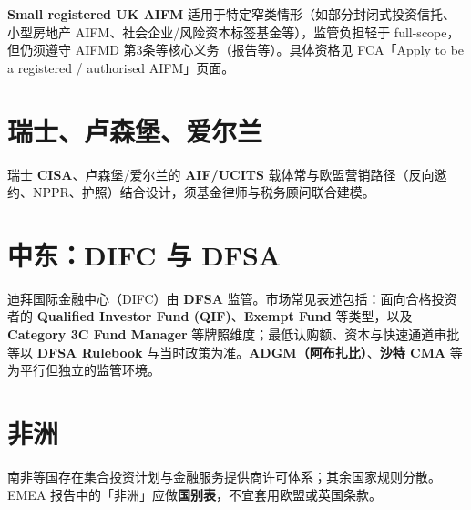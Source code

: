 \textbf{Small registered UK AIFM} 适用于特定窄类情形（如部分封闭式投资信托、小型房地产 AIFM、社会企业/风险资本标签基金等），监管负担轻于 full-scope，但仍须遵守 AIFMD 第3条等核心义务（报告等）。具体资格见 FCA「Apply to be a registered / authorised AIFM」页面。

\section{瑞士、卢森堡、爱尔兰}

瑞士 \textbf{CISA}、卢森堡/爱尔兰的 \textbf{AIF/UCITS} 载体常与欧盟营销路径（反向邀约、NPPR、护照）结合设计，须基金律师与税务顾问联合建模。

\section{中东：DIFC 与 DFSA}

迪拜国际金融中心（DIFC）由 \textbf{DFSA} 监管。市场常见表述包括：面向合格投资者的 \textbf{Qualified Investor Fund (QIF)}、\textbf{Exempt Fund} 等类型，以及 \textbf{Category 3C Fund Manager} 等牌照维度；最低认购额、资本与快速通道审批等以 \textbf{DFSA Rulebook} 与当时政策为准。\textbf{ADGM（阿布扎比）}、\textbf{沙特 CMA} 等为平行但独立的监管环境。

\section{非洲}

南非等国存在集合投资计划与金融服务提供商许可体系；其余国家规则分散。EMEA 报告中的「非洲」应做\textbf{国别表}，不宜套用欧盟或英国条款。
